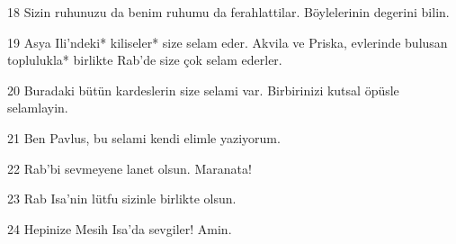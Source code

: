 \par 18 Sizin ruhunuzu da benim ruhumu da ferahlattilar. Böylelerinin degerini bilin.
\par 19 Asya Ili'ndeki* kiliseler* size selam eder. Akvila ve Priska, evlerinde bulusan toplulukla* birlikte Rab'de size çok selam ederler.
\par 20 Buradaki bütün kardeslerin size selami var. Birbirinizi kutsal öpüsle selamlayin.
\par 21 Ben Pavlus, bu selami kendi elimle yaziyorum.
\par 22 Rab'bi sevmeyene lanet olsun. Maranata!
\par 23 Rab Isa'nin lütfu sizinle birlikte olsun.
\par 24 Hepinize Mesih Isa'da sevgiler! Amin.


